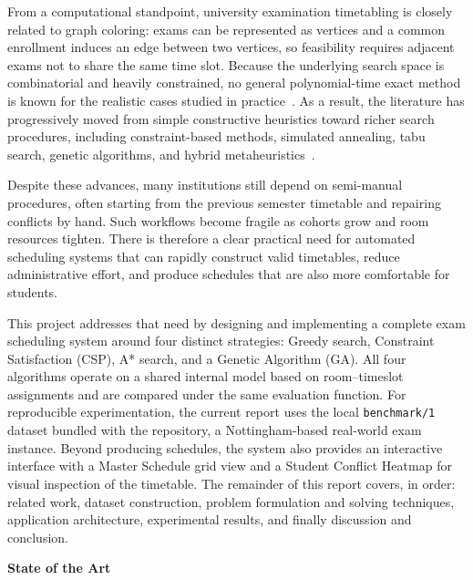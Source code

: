 From a computational standpoint, university examination timetabling is
closely related to graph coloring: exams can be represented as vertices
and a common enrollment induces an edge between two vertices, so
feasibility requires adjacent exams not to share the same time slot.
Because the underlying search space is combinatorial and heavily
constrained, no general polynomial-time exact method is known for the
realistic cases studied in practice~\parencite{carter1996,qu2009}. As a
result, the literature has progressively moved from simple constructive
heuristics toward richer search procedures, including constraint-based
methods, simulated annealing, tabu search, genetic algorithms, and
hybrid metaheuristics~\parencite{burke2002,qu2009,leite2019}.

Despite these advances, many institutions still depend on semi-manual
procedures, often starting from the previous semester timetable and
repairing conflicts by hand. Such workflows become fragile as cohorts
grow and room resources tighten. There is therefore a clear practical
need for automated scheduling systems that can rapidly construct valid
timetables, reduce administrative effort, and produce schedules that are
also more comfortable for students.

This project addresses that need by designing and implementing a
complete exam scheduling system around four distinct strategies: Greedy
search, Constraint Satisfaction (CSP), A* search, and a Genetic
Algorithm (GA). All four algorithms operate on a shared internal model
based on room--timeslot assignments and are compared under the same
evaluation function. For reproducible experimentation, the current
report uses the local \texttt{benchmark/1} dataset bundled with the
repository, a Nottingham-based real-world exam instance. Beyond
producing schedules, the system also provides an interactive interface
with a Master Schedule grid view and a Student Conflict Heatmap for
visual inspection of the timetable. The remainder of this report covers,
in order: related work, dataset construction, problem formulation and
solving techniques, application architecture, experimental results, and
finally discussion and conclusion.

\newpage
{}
{}
{\large\bfseries State of the Art}
\vspace{2pt}
\titlerule
\vspace{6pt}

